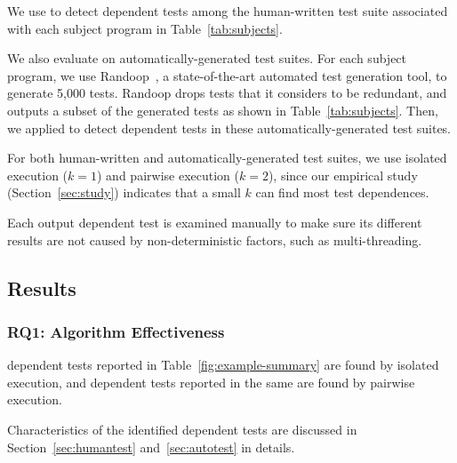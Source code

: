 We use \ourtool to detect dependent
tests among the human-written test suite 
associated with each subject program in Table~\ref{tab:subjects}.

We also evaluate \ourtool on automatically-generated
test suites. For each subject program, we use
Randoop~\cite{PachecoLET2007}, a state-of-the-art automated
test generation tool, to generate 5,000 tests.
Randoop drops tests that it considers to be redundant,
and outputs a subset of the generated tests as
shown in Table~\ref{tab:subjects}.
Then, we applied \ourtool to detect dependent tests
in these automatically-generated test suites.

For both human-written and automatically-generated
test suites, we use isolated execution ($k = 1$)
and pairwise execution ($k = 2$), since our empirical
study (Section~\ref{sec:study}) indicates that  a small $k$
can find most test dependences. 

Each output dependent test is examined manually to make
sure its different results are not caused by non-deterministic
factors, such as multi-threading.


\subsection{Results}


\subsubsection{RQ1: Algorithm Effectiveness}

 dependent tests reported in Table~\ref{fig:example-summary}
are found by isolated execution, and  dependent
tests reported in the same are found by pairwise execution.

 

Characteristics of the identified dependent tests are discussed
in Section~\ref{sec:humantest} and~\ref{sec:autotest} in details.


